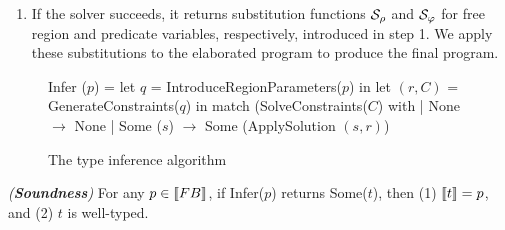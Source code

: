 \begin{enumerate}
 \item If the solver succeeds, it returns substitution functions $\mathcal{S}_\rho$ and
  $\mathcal{S}_\varphi$ for free region and predicate variables, respectively, introduced in
  step 1. We apply these substitutions to the elaborated program to produce the final program.


\end{enumerate}



\begin{figure}
\begin{numcodeml}
Infer ($p$) =
  let $q$ = IntroduceRegionParameters($p$) in
  let $(r,C)$ = GenerateConstraints($q$) in
  match (SolveConstraints($C$) with
  | None $\longrightarrow$ None
  | Some ($s$) $\longrightarrow$ Some (ApplySolution $(s,r)$)
\end{numcodeml}

\caption{The type inference algorithm}
\label{fig:type-inference-algo}
\end{figure}

\begin{theorem}
\emph{(\textbf{Soundness})}
For any $p \in \llbracket {\sc FB} \rrbracket$, if Infer($p$) returns Some($t$), then
(1) $\llbracket t \rrbracket = p$, and
(2) $t$ is well-typed.
\end{theorem}




